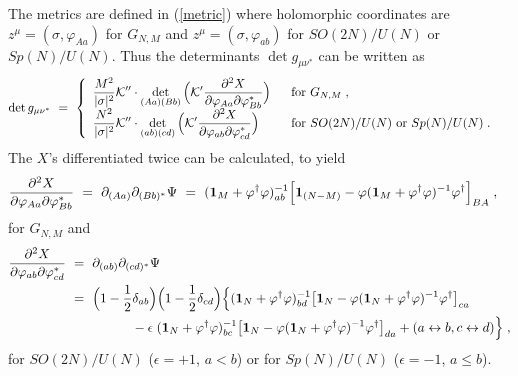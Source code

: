 \documentclass[a4paper,11pt]{article}
\newcommand{\del}{\partial}
\newcommand{\half}{\frac{1}{2}}
\newcommand{\LS}{\ \ \ \ \ \ \ \ \ \ }
\newcommand{\ls}{\ \ \ \ \ }
\newcommand{\dps}{\displaystyle}
\begin{document}
{The metrics are defined in (\ref{metric})
where holomorphic coordinates are $z^{\mu} = (\sigma ,
\varphi_{A a})$ for $G_{N,M}$ and $z^{\mu} = (\sigma , \varphi_{a b})$
for $SO(2N)/U(N)$ or $Sp(N)/U(N)$.
Thus the determinants $\det g_{\mu \nu^*}$ can be written as 
\begin{align}
\det g_{\mu \nu^*} \ &= \ \left\{
\begin{array}{l@{\ls}l}
\dps \frac{M^2}{|\sigma|^2} {\cal K}'' \cdot \det_{(A a) (B b)} 
\Big(
{\cal K}' \frac{\del^2 X}{\del \varphi_{A a} \del \varphi_{B b}^*} 
\Big)
& \mbox{for $G_{N,M}$} \; , \\
\dps \frac{N^2}{|\sigma|^2} {\cal K}'' \cdot \det_{(a b) (c d)} 
\Big(
{\cal K}' \frac{\del^2 X}{\del \varphi_{a b} \del \varphi_{c d}^*} 
\Big) 
& \mbox{for $SO(2N)/U(N)$ or $Sp(N)/U(N)$} \; .
\end{array} \right. \label{det-g-so-sp0}
\end{align}
The $X$'s differentiated twice can be calculated, 
to yield
\begin{align}
\frac{\del^2 X}{\del \varphi_{A a} \del \varphi^*_{B b}}
 \ &= \ \del_{(Aa)}\del_{(Bb)^*}\Psi 
 \ = \ ({\bf 1}_M + \varphi^{\dagger} \varphi)^{-1}_{a b} 
 \Big[ {\bf 1}_{(N-M)} -
   \varphi ({\bf 1}_M + \varphi^{\dagger} \varphi)^{-1} 
   \varphi^{\dagger} \Big]_{B A} \;, \label{deriv-g}
\end{align}
for $G_{N,M}$ and
\begin{align}
\frac{\del^2 X}{\del \varphi_{a b} \del \varphi^*_{c d}} 
 \ &= \ \del_{(ab)} \del_{(cd)^*} \Psi \nonumber \\
 \ &= \ \Big( 1 - \half \delta_{a b} \Big) 
  \Big( 1 - \half \delta_{c d} \Big) 
  \Big\{ ({\bf 1}_N + \varphi^{\dagger} \varphi)^{-1}_{b d} 
   \big[ {\bf 1}_N 
     - \varphi ({\bf 1}_N + \varphi^{\dagger}\varphi)^{-1} 
       \varphi^{\dagger} \big]_{c a} \nonumber \\
 \ & \LS \ \ \ \ 
 - \epsilon \; ({\bf 1}_N + \varphi^{\dagger}\varphi)^{-1}_{b c} 
   \big[ {\bf 1}_N 
      - \varphi ({\bf 1}_N + \varphi^{\dagger} \varphi)^{-1} 
        \varphi^{\dagger} \big]_{d a}
 + (a \leftrightarrow b, c \leftrightarrow d)
 \Big\} \; , \label{deriv-so-sp}
\end{align}
for $SO(2N)/U(N)$ ($\epsilon = + 1$, $a < b$) or 
for $Sp(N)/U(N)$ ($\epsilon = - 1$, $a \leq b$). 

}
\end{document}

